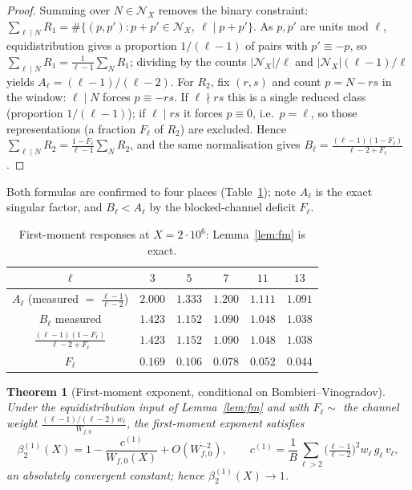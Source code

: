 \documentclass[]{interact}%
\newtheorem{theorem}{Theorem}
\begin{document}
\begin{proof}
Summing over $N\in\mathcal N_X$ removes the binary constraint:
$\sum_{\ell\mid N}R_1=\#\{(p,p'):p+p'\in\mathcal N_X,\ \ell\mid p+p'\}$. As $p,p'$ are
units mod $\ell$, equidistribution gives a proportion $1/(\ell-1)$ of pairs with
$p'\equiv-p$, so $\sum_{\ell\mid N}R_1=\frac{1}{\ell-1}\sum_NR_1$; dividing by the
counts $|\mathcal N_X|/\ell$ and $|\mathcal N_X|(\ell-1)/\ell$ yields
$A_\ell=(\ell-1)/(\ell-2)$. For $R_2$, fix $(r,s)$ and count $p=N-rs$ in the window:
$\ell\mid N$ forces $p\equiv-rs$. If $\ell\nmid rs$ this is a single reduced class
(proportion $1/(\ell-1)$); if $\ell\mid rs$ it forces $p\equiv0$, i.e.\ $p=\ell$, so
those representations (a fraction $F_\ell$ of $R_2$) are excluded. Hence
$\sum_{\ell\mid N}R_2=\frac{1-F_\ell}{\ell-1}\sum_NR_2$, and the same normalisation gives
$B_\ell=\frac{(\ell-1)(1-F_\ell)}{\ell-2+F_\ell}$.
\end{proof}

Both formulas are confirmed to four places (Table~\ref{tab:fm}); note $A_\ell$ is the
exact singular factor, and $B_\ell<A_\ell$ by the blocked-channel deficit $F_\ell$.

\begin{table}[h]
\centering
\begin{tabular}{cccccc}
\toprule
$\ell$ & $3$ & $5$ & $7$ & $11$ & $13$\\
\midrule
$A_\ell$ (measured $=$ $\tfrac{\ell-1}{\ell-2}$) & $2.000$ & $1.333$ & $1.200$ & $1.111$ & $1.091$\\
$B_\ell$ measured & $1.423$ & $1.152$ & $1.090$ & $1.048$ & $1.038$\\
$\frac{(\ell-1)(1-F_\ell)}{\ell-2+F_\ell}$ & $1.423$ & $1.152$ & $1.090$ & $1.048$ & $1.038$\\
$F_\ell$ & $0.169$ & $0.106$ & $0.078$ & $0.052$ & $0.044$\\
\bottomrule
\end{tabular}
\caption{First-moment responses at $X=2\cdot10^{6}$: Lemma~\ref{lem:fm} is exact.}
\label{tab:fm}
\end{table}

\begin{theorem}[First-moment exponent, conditional on Bombieri--Vinogradov]\label{thm:fm}
Under the equidistribution input of Lemma~\ref{lem:fm} and with $F_\ell\sim$ the
channel weight $\frac{(\ell-1)/(\ell-2)\,w_\ell}{W_{f,0}}$, the first-moment
exponent satisfies
\[
  \beta_2^{(1)}(X)=1-\frac{c^{(1)}}{W_{f,0}(X)}+O(W_{f,0}^{-2}),
  \qquad c^{(1)}=\frac{1}{B}\sum_{\ell>2}\Big(\tfrac{\ell-1}{\ell-2}\Big)^{2}w_\ell\,g_\ell\,v_\ell ,
\]
an absolutely convergent constant; hence $\beta_2^{(1)}(X)\to1$.
\end{theorem}
\end{document}
